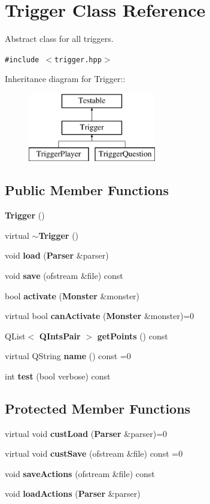 \section{Trigger Class Reference}
\label{classTrigger}
Abstract class for all triggers.  


{\tt \#include $<$trigger.hpp$>$}

Inheritance diagram for Trigger::\begin{figure}[H]
\begin{center}
\leavevmode
\includegraphics[height=3cm]{classTrigger}
\end{center}
\end{figure}
\subsection*{Public Member Functions}
\begin{CompactItemize}
\item 
{\bf Trigger} ()
\item 
virtual {\bf $\sim$Trigger} ()
\item 
void {\bf load} ({\bf Parser} \&parser)
\item 
void {\bf save} (ofstream \&file) const 
\item 
bool {\bf activate} ({\bf Monster} \&monster)
\item 
virtual bool {\bf can\-Activate} ({\bf Monster} \&monster)=0
\item 
QList$<$ {\bf QInts\-Pair} $>$ {\bf get\-Points} () const 
\item 
virtual QString {\bf name} () const =0
\item 
int {\bf test} (bool verbose) const 
\end{CompactItemize}
\subsection*{Protected Member Functions}
\begin{CompactItemize}
\item 
virtual void {\bf cust\-Load} ({\bf Parser} \&parser)=0
\item 
virtual void {\bf cust\-Save} (ofstream \&file) const =0
\item 
void {\bf save\-Actions} (ofstream \&file) const 
\item 
void {\bf load\-Actions} ({\bf Parser} \&parser)
\end{CompactItemize}
